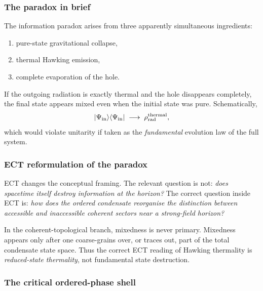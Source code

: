 \documentclass[11pt,a4paper]{article}
\numberwithin{equation}{section}
\begin{document}
\subsubsection*{The paradox in brief}

The information paradox arises from three apparently simultaneous
ingredients:
\begin{enumerate}[label=(\roman*)]
  \item pure-state gravitational collapse,
  \item thermal Hawking emission,
  \item complete evaporation of the hole.
\end{enumerate}
If the outgoing radiation is exactly thermal and the hole disappears
completely, the final state appears mixed even when the initial state
was pure.
Schematically,
\begin{equation}
  \label{eq:qs_info_loss_naive}
  |\Psi_{\rm in}\rangle\langle\Psi_{\rm in}|
  \;\longrightarrow\;
  \rho_{\rm rad}^{\rm thermal},
\end{equation}
which would violate unitarity if taken as the \emph{fundamental}
evolution law of the full system.

\subsubsection*{ECT reformulation of the paradox}

ECT changes the conceptual framing.
The relevant question is not: \emph{does spacetime itself destroy
information at the horizon?}
The correct question inside ECT is: \emph{how does the ordered
condensate reorganise the distinction between accessible and
inaccessible coherent sectors near a strong-field horizon?}

In the coherent-topological branch, mixedness is never primary.
Mixedness appears only after one coarse-grains over, or traces out,
part of the total condensate state space.
Thus the correct ECT reading of Hawking thermality is
\emph{reduced-state thermality}, not fundamental state destruction.

\subsubsection*{The critical ordered-phase shell}
\end{document}
